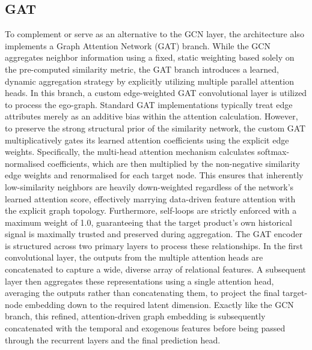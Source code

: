 \subsection{GAT}
To complement or serve as an alternative to the GCN layer, the architecture also implements a Graph Attention Network (GAT) branch. While the GCN aggregates neighbor information using a fixed, static weighting based solely on the pre-computed similarity metric, the GAT branch introduces a learned, dynamic aggregation strategy by explicitly utilizing multiple parallel attention heads.  In this branch, a custom edge-weighted GAT convolutional layer is utilized to process the ego-graph. Standard GAT implementations typically treat edge attributes merely as an additive bias within the attention calculation. However, to preserve the strong structural prior of the similarity network, the custom GAT multiplicatively gates its learned attention coefficients using the explicit edge weights. Specifically, the multi-head attention mechanism calculates softmax-normalised coefficients, which are then multiplied by the non-negative similarity edge weights and renormalised for each target node. This ensures that inherently low-similarity neighbors are heavily down-weighted regardless of the network's learned attention score, effectively marrying data-driven feature attention with the explicit graph topology. Furthermore, self-loops are strictly enforced with a maximum weight of 1.0, guaranteeing that the target product's own historical signal is maximally trusted and preserved during aggregation.  The GAT encoder is structured across two primary layers to process these relationships. In the first convolutional layer, the outputs from the multiple attention heads are concatenated to capture a wide, diverse array of relational features. A subsequent layer then aggregates these representations using a single attention head, averaging the outputs rather than concatenating them, to project the final target-node embedding down to the required latent dimension. Exactly like the GCN branch, this refined, attention-driven graph embedding is subsequently concatenated with the temporal and exogenous features before being passed through the recurrent layers and the final prediction head.  

